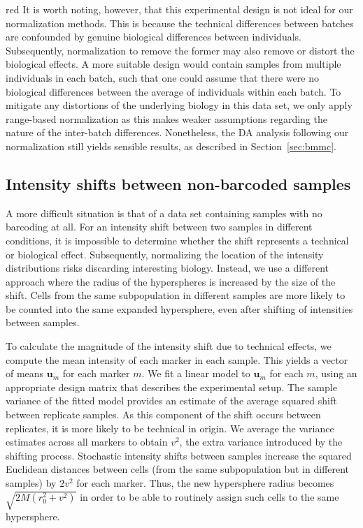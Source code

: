 \documentclass{article}
\begin{document}
\begin{color}{red}
It is worth noting, however, that this experimental design is not ideal for our normalization methods.
This is because the technical differences between batches are confounded by genuine biological differences between individuals.
Subsequently, normalization to remove the former may also remove or distort the biological effects.
A more suitable design would contain samples from multiple individuals in each batch, such that one could assume that there were no biological differences between the average of individuals within each batch.
To mitigate any distortions of the underlying biology in this data set, we only apply range-based normalization as this makes weaker assumptions regarding the nature of the inter-batch differences.
Nonetheless, the DA analysis following our normalization still yields sensible results, as described in Section~\ref{sec:bmmc}.

\subsection{Intensity shifts between non-barcoded samples}
A more difficult situation is that of a data set containing samples with no barcoding at all.
For an intensity shift between two samples in different conditions, it is impossible to determine whether the shift represents a technical or biological effect.
Subsequently, normalizing the location of the intensity distributions risks discarding interesting biology.
Instead, we use a different approach where the radius of the hyperspheres is increased by the size of the shift.
Cells from the same subpopulation in different samples are more likely to be counted into the same expanded hypersphere, even after shifting of intensities between samples.

To calculate the magnitude of the intensity shift due to technical effects, we compute the mean intensity of each marker in each sample.
This yields a vector of means $\mathbf{u}_m$ for each marker $m$.
We fit a linear model to $\mathbf{u}_m$ for each $m$, using an appropriate design matrix that describes the experimental setup.
The sample variance of the fitted model provides an estimate of the average squared shift between replicate samples.
As this component of the shift occurs between replicates, it is more likely to be technical in origin.
We average the variance estimates across all markers to obtain $v^2$, the extra variance introduced by the shifting process.
Stochastic intensity shifts between samples increase the squared Euclidean distances between cells (from the same subpopulation but in different samples) by $2v^2$ for each marker.
Thus, the new hypersphere radius becomes $\sqrt{2M(r_0^2 + v^2)}$ in order to be able to routinely assign such cells to the same hypersphere.


\end{color}
\end{document}
